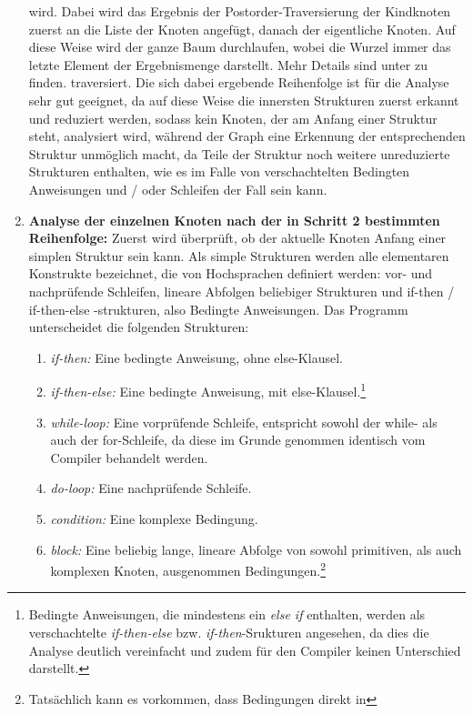 \documentclass[11pt]{article}
\begin{document}
\begin{enumerate}
{			wird. Dabei wird das Ergebnis der Postorder-Traversierung der Kindknoten
			zuerst an die Liste der Knoten angefügt, danach der eigentliche Knoten. Auf
			diese Weise wird der ganze Baum durchlaufen, wobei die Wurzel immer das
			letzte Element der Ergebnismenge darstellt. Mehr Details sind unter
			\cite{wiki3:6} zu finden.
		}
		traversiert. Die sich dabei ergebende Reihenfolge ist
		für die Analyse sehr gut geeignet, da auf diese Weise die innersten Strukturen
		zuerst erkannt und reduziert werden, sodass kein Knoten, der am Anfang einer
		Struktur steht, analysiert wird, während der Graph eine Erkennung der entsprechenden
		Struktur unmöglich macht, da Teile der Struktur noch weitere unreduzierte Strukturen
		enthalten, wie es im Falle von verschachtelten Bedingten Anweisungen und / oder Schleifen
		der Fall sein kann.
	\item{\textbf{Analyse der einzelnen Knoten nach der in Schritt 2 bestimmten Reihenfolge:}}
		Zuerst wird überprüft, ob der aktuelle Knoten Anfang einer simplen
		Struktur sein kann. Als simple Strukturen werden alle elementaren
		Konstrukte bezeichnet, die von Hochsprachen definiert werden: vor-
		und nachprüfende Schleifen, lineare Abfolgen beliebiger Strukturen
		und if-then / if-then-else -strukturen, also Bedingte Anweisungen.
		Das Programm unterscheidet die folgenden Strukturen:
		\begin{enumerate}
			\item{\textit{if-then:}}
				Eine bedingte Anweisung, ohne else-Klausel.
			\item{\textit{if-then-else:}}
				Eine bedingte Anweisung, mit else-Klausel.\footnote{
					Bedingte Anweisungen, die mindestens ein \textit{else if}
					enthalten, werden als verschachtelte \textit{if-then-else}
					bzw. \textit{if-then}-Srukturen angesehen, da dies die
					Analyse deutlich vereinfacht und zudem für den Compiler
					keinen Unterschied darstellt.
				}
			\item{\textit{while-loop:}}
				Eine vorprüfende Schleife, entspricht sowohl der
				while- als auch der for-Schleife, da diese im Grunde
				genommen identisch vom Compiler behandelt werden.
			\item{\textit{do-loop:}}
				Eine nachprüfende Schleife.
			\item{\textit{condition:}}
				Eine komplexe Bedingung.
			\item{\textit{block:}}
				Eine beliebig lange, lineare Abfolge von sowohl
				primitiven, als auch komplexen Knoten, ausgenommen
				Bedingungen.\footnote{
					Tatsächlich kann es vorkommen, dass Bedingungen direkt in
}
\end{enumerate}
\end{enumerate}
\end{document}
